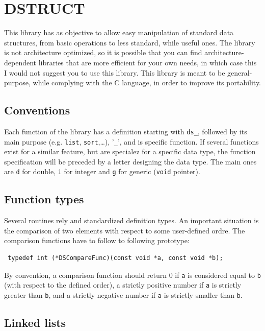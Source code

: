 \chapter{DSTRUCT}

This library has as objective to allow easy manipulation of standard
data structures, from basic operations to less standard, while useful
ones.
The library is not architecture optimized, so it is possible that you
can find architecture-dependent libraries that are more efficient for
your own needs, in which case this I would not suggest you to use this
library.
This library is meant to be general-purpose, while complying with the
C language, in order to improve its portability.

\section{Conventions}

Each function of the library has a definition starting with
\verb|ds_|, followed by its main purpose (e.g. \verb|list|,
\verb|sort|,\ldots), '\verb|_|', and is specific function.
If several functions exist for a similar feature, but are specialez
for a specific data type, the function specification will be preceded
by a letter designing the data type.
The main ones are \verb|d| for double, \verb|i| for integer and
\verb|g| for generic (\verb|void| pointer).

\section{Function types}

Several routines rely and standardized definition types.
An important situation is the comparison of two elements with respect to some user-defined ordre.
The comparison functions have to follow to following prototype:
\begin{verbatim}
 typedef int (*DSCompareFunc)(const void *a, const void *b);
\end{verbatim}
By convention, a comparison function should return 0 if \verb|a| is considered equal to \verb|b|
(with respect to the defined order), a strictly positive number if \verb|a| is strictly greater
than \verb|b|, and a strictly negative number if \verb|a| is strictly smaller than \verb|b|.

\section{Linked lists}
\label{sec:list}

